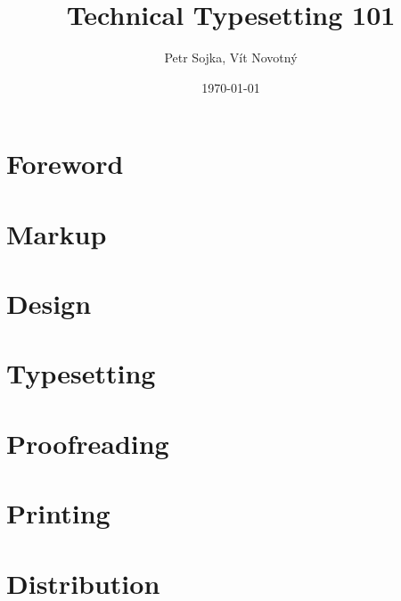 \documentclass{book}
\title{Technical Typesetting 101}
\author{Petr Sojka, Vít Novotný}
\date{\today}
\begin{document}
\frontmatter
  \maketitle
  \tableofcontents
\mainmatter
\chapter{Foreword}
\chapter{Markup}
\chapter{Design}
\chapter{Typesetting}
\chapter{Proofreading}
\chapter{Printing}
\chapter{Distribution}
\end{document}
